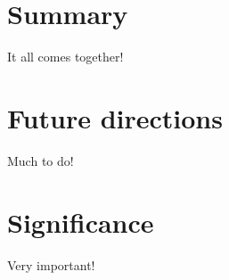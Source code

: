 \section{Summary}

It all comes together!

\section{Future directions}

Much to do!

\section{Significance}

Very important!